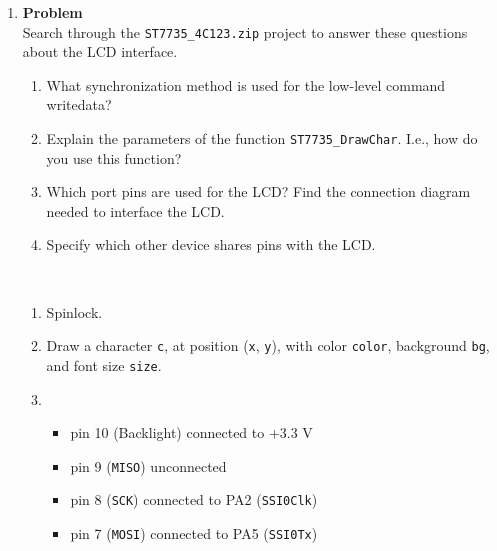 \documentclass[12pt]{article}
\newenvironment{Ex}{\textbf{Problem}\vspace{.75em}\\}{}
\begin{document}
\begin{enumerate}
\begin{Ex}
\begin{solution}
\begin{enumerate}
      \item The vector table exists in \verb|startup.s|. The system
        finds the named function and calls that function when the
        interrupt is received.
      \item The acknowledgement occurs by setting a bit in a
        memory-mapped hardware register. For this device, bit 6 is set
        to acknowledge the interrupt.
      \item The TM4C is like a PC. It has two 16-byte FIFOs (one for
        transmit, one for receive).
      \end{enumerate}
    \end{solution}
  \end{Ex}
\item
  \begin{Ex}
    Search through the \verb|ST7735_4C123.zip| project to answer these
    questions about the LCD interface.
    \begin{enumerate}
    \item What synchronization method is used for the low-level
      command writedata?
    \item Explain the parameters of the function
      \verb|ST7735_DrawChar|. I.e., how do you use this function?
    \item Which port pins are used for the LCD? Find the connection
      diagram needed to interface the LCD.
    \item Specify which other device shares pins with the LCD.
    \end{enumerate}
    \begin{solution} \hfill \vspace{.75em} \\
      \begin{enumerate}
      \item Spinlock.
      \item Draw a character \verb|c|, at position (\verb|x|,
        \verb|y|), with color \verb|color|, background \verb|bg|, and
        font size \verb|size|.
      \item
        \begin{itemize}
        \item pin 10 (Backlight) connected to +3.3 V
        \item pin 9 (\verb|MISO|) unconnected
        \item pin 8 (\verb|SCK|) connected to PA2 (\verb|SSI0Clk|)
        \item pin 7 (\verb|MOSI|) connected to PA5 (\verb|SSI0Tx|)

\end{itemize}
\end{enumerate}
\end{solution}
\end{Ex}
\end{enumerate}
\end{document}
